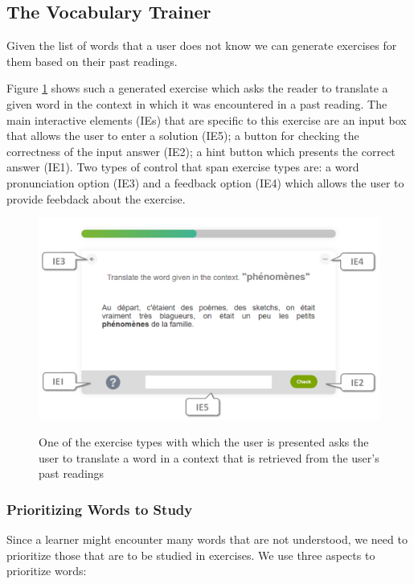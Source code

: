 \subsection{The Vocabulary Trainer}

Given the list of words that a user does not know we can generate exercises for them based on their past readings.

Figure \ref{exercise_translate} shows such a generated exercise which asks the reader to translate a given word in the context in which it was encountered in a past reading. The main interactive elements (IEs) that are specific to this exercise are an input box that allows the user to enter a solution (IE5); a button for checking the correctness of the input answer (IE2); a hint button which presents the correct answer (IE1). Two types of control that span exercise types are: a word pronunciation option (IE3) and a feedback option (IE4) which allows the user to provide feebdack about the exercise.

\begin{figure}[h!]
\centering
  \includegraphics[width=\columnwidth]{figures/exercise_translate}
  \caption{One of the exercise types with which the user is presented asks the user to translate a word in a context that is retrieved from the user's past readings}{
  \label{exercise_translate}
  }
\end{figure}

\subsubsection{Prioritizing Words to Study}

Since a learner might encounter many words that are not understood, we need to prioritize those that are to be studied in exercises. We use three aspects to prioritize words: 

